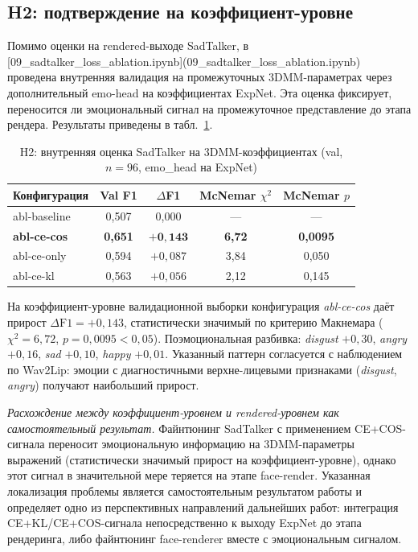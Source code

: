 \documentclass[a4paper, 12pt, oneside, openany]{article}
\begin{document}
\subsection{H2: подтверждение на коэффициент-уровне}

Помимо оценки на rendered-выходе SadTalker, в [09\_sadtalker\_loss\_ablation.ipynb](09\_sadtalker\_loss\_ablation.ipynb) проведена внутренняя валидация на промежуточных 3DMM-параметрах через дополнительный emo-head на коэффициентах ExpNet. Эта оценка фиксирует, переносится ли эмоциональный сигнал на промежуточное представление до этапа рендера. Результаты приведены в табл.~\ref{tab:sadtalker_coef}.

\begin{table}[H]
\caption{H2: внутренняя оценка SadTalker на 3DMM-коэффициентах (val, $n=96$, emo\_head на ExpNet)}
\label{tab:sadtalker_coef}
\centering
\small
\begin{tabular}{|p{2.5cm}|c|c|c|c|}
\hline
\textbf{Конфигурация} & \textbf{Val F1} & $\Delta$F1 & \textbf{McNemar $\chi^2$} & \textbf{McNemar $p$} \\
\hline
abl-baseline & 0,507 & 0,000 & --- & --- \\
\hline
\textbf{abl-ce-cos} & \textbf{0,651} & $\boldsymbol{+0{,}143}$ & \textbf{6,72} & \textbf{0,0095} \\
\hline
abl-ce-only & 0,594 & $+0{,}087$ & 3,84 & 0,050 \\
\hline
abl-ce-kl & 0,563 & $+0{,}056$ & 2,12 & 0,145 \\
\hline
\end{tabular}
\end{table}

На коэффициент-уровне валидационной выборки конфигурация \textit{abl-ce-cos} даёт прирост $\Delta\mathrm{F1}=+0{,}143$, статистически значимый по критерию Макнемара ($\chi^2 = 6{,}72$, $p = 0{,}0095 < 0{,}05$). Поэмоциональная разбивка: \textit{disgust} $+0{,}30$, \textit{angry} $+0{,}16$, \textit{sad} $+0{,}10$, \textit{happy} $+0{,}01$. Указанный паттерн согласуется с наблюдением по Wav2Lip: эмоции с диагностичными верхне-лицевыми признаками (\textit{disgust}, \textit{angry}) получают наибольший прирост.

\textit{Расхождение между коэффициент-уровнем и rendered-уровнем как самостоятельный результат.} Файнтюнинг SadTalker с применением CE+COS-сигнала переносит эмоциональную информацию на 3DMM-параметры выражений (статистически значимый прирост на коэффициент-уровне), однако этот сигнал в значительной мере теряется на этапе face-render. Указанная локализация проблемы является самостоятельным результатом работы и определяет одно из перспективных направлений дальнейших работ: интеграция CE+KL/CE+COS-сигнала непосредственно к выходу ExpNet до этапа рендеринга, либо файнтюнинг face-renderer вместе с эмоциональным сигналом.
\end{document}
